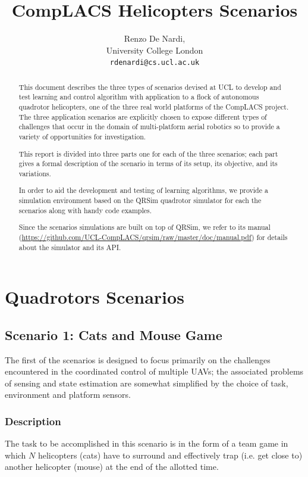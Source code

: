 \documentclass[a4paper,11pt]{report}
\title{{CompLACS} Helicopters Scenarios}
\author{Renzo De Nardi,\\University College London\\\texttt{rdenardi@cs.ucl.ac.uk}}
\newcommand{\sname}{QRSim\xspace}
\newcommand{\webman}{\url{https://github.com/UCL-CompLACS/qrsim/raw/master/doc/manual.pdf}\xspace}
\begin{document}
\maketitle



\begin{abstract}
This document describes the three types of scenarios devised at UCL to develop and test learning and control algorithm with application to a flock of autonomous quadrotor helicopters, one of the three real world platforms of the {CompLACS} project.
The three application scenarios are explicitly chosen to expose different types of challenges that occur in the domain of multi-platform aerial robotics so to provide a variety of opportunities for investigation.

This report is divided into three parts one for each of the three scenarios; each part gives a formal description of the scenario in terms of its setup, its objective, and its variations. 

In order to aid the development and testing of learning algorithms, we provide a simulation environment based on the \sname quadrotor simulator for each the scenarios along with handy code examples.

Since the scenarios simulations are built on top of \sname, we refer to its manual (\webman) for details about the simulator and its API.

\end{abstract}

\tableofcontents

\chapter{Quadrotors Scenarios}

\section{Scenario 1: Cats and Mouse Game}

The first of the scenarios is designed to focus primarily on the challenges encountered in the coordinated control of multiple UAVs; the associated problems of sensing and state estimation are somewhat simplified by the choice of task, environment and platform sensors. 

\subsection{Description}
The task to be accomplished in this scenario is in the form of a team game in which $N$ helicopters (cats) have to surround and effectively trap (i.e. get close to) another helicopter (mouse) at the end of the allotted time. 
\end{document}
